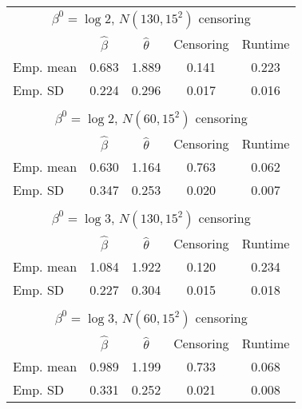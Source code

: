 \documentclass[english]{article}
\providecommand{\tabularnewline}{\\}
\begin{document}
\begin{table}
{\protect\centering{}%
\begin{tabular}{l|c|c|c|c|}
\multicolumn{5}{c}{$\beta^{0}=\log2$, $N(130,15^{2})$ censoring}\tabularnewline
\cline{2-5} 
 & $\hat{\beta}$ & $\hat{\theta}$ & Censoring & Runtime\tabularnewline
\hline 
\multicolumn{1}{|l|}{Emp. mean} & 0.683 & 1.889 & 0.141 & 0.223\tabularnewline
\hline 
\multicolumn{1}{|l|}{Emp. SD} & 0.224 & 0.296 & 0.017 & 0.016\tabularnewline
\hline 
\multicolumn{1}{l}{} & \multicolumn{1}{c}{} & \multicolumn{1}{c}{} & \multicolumn{1}{c}{} & \multicolumn{1}{c}{}\tabularnewline
\multicolumn{5}{c}{$\beta^{0}=\log2$, $N(60,15^{2})$ censoring}\tabularnewline
\cline{2-5} 
 & $\hat{\beta}$ & $\hat{\theta}$ & Censoring & Runtime\tabularnewline
\hline 
\multicolumn{1}{|l|}{Emp. mean} & 0.630 & 1.164 & 0.763 & 0.062\tabularnewline
\hline 
\multicolumn{1}{|l|}{Emp. SD} & 0.347 & 0.253 & 0.020 & 0.007\tabularnewline
\hline 
\multicolumn{1}{l}{} & \multicolumn{1}{c}{} & \multicolumn{1}{c}{} & \multicolumn{1}{c}{} & \multicolumn{1}{c}{}\tabularnewline
\multicolumn{5}{c}{$\beta^{0}=\log3$, $N(130,15^{2})$ censoring}\tabularnewline
\cline{2-5} 
 & $\hat{\beta}$ & $\hat{\theta}$ & Censoring & Runtime\tabularnewline
\hline 
\multicolumn{1}{|l|}{Emp. mean} & 1.084 & 1.922 & 0.120 & 0.234\tabularnewline
\hline 
\multicolumn{1}{|l|}{Emp. SD} & 0.227 & 0.304 & 0.015 & 0.018\tabularnewline
\hline 
\multicolumn{1}{l}{} & \multicolumn{1}{c}{} & \multicolumn{1}{c}{} & \multicolumn{1}{c}{} & \multicolumn{1}{c}{}\tabularnewline
\multicolumn{5}{c}{$\beta^{0}=\log3$, $N(60,15^{2})$ censoring}\tabularnewline
\cline{2-5} 
 & $\hat{\beta}$ & $\hat{\theta}$ & Censoring & Runtime\tabularnewline
\hline 
\multicolumn{1}{|l|}{Emp. mean} & 0.989 & 1.199 & 0.733 & 0.068\tabularnewline
\hline 
\multicolumn{1}{|l|}{Emp. SD} & 0.331 & 0.252 & 0.021 & 0.008\tabularnewline
\hline 
\end{tabular}\protect}\hfill{}
\end{table}
\end{document}
